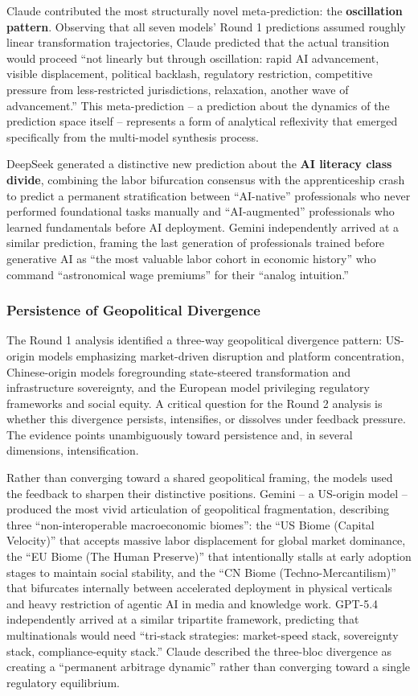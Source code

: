 \documentclass[preprint,review,12pt]{elsarticle}
\begin{document}
Claude contributed the most structurally novel meta-prediction: the \textbf{oscillation pattern}. Observing that all seven models' Round 1 predictions assumed roughly linear transformation trajectories, Claude predicted that the actual transition would proceed ``not linearly but through oscillation: rapid AI advancement, visible displacement, political backlash, regulatory restriction, competitive pressure from less-restricted jurisdictions, relaxation, another wave of advancement.'' This meta-prediction -- a prediction about the dynamics of the prediction space itself -- represents a form of analytical reflexivity that emerged specifically from the multi-model synthesis process.

DeepSeek generated a distinctive new prediction about the \textbf{AI literacy class divide}, combining the labor bifurcation consensus with the apprenticeship crash to predict a permanent stratification between ``AI-native'' professionals who never performed foundational tasks manually and ``AI-augmented'' professionals who learned fundamentals before AI deployment. Gemini independently arrived at a similar prediction, framing the last generation of professionals trained before generative AI as ``the most valuable labor cohort in economic history'' who command ``astronomical wage premiums'' for their ``analog intuition.''


\subsubsection{Persistence of Geopolitical Divergence}
\label{sec:geopolitical_persistence}

The Round 1 analysis identified a three-way geopolitical divergence pattern: US-origin models emphasizing market-driven disruption and platform concentration, Chinese-origin models foregrounding state-steered transformation and infrastructure sovereignty, and the European model privileging regulatory frameworks and social equity. A critical question for the Round 2 analysis is whether this divergence persists, intensifies, or dissolves under feedback pressure. The evidence points unambiguously toward persistence and, in several dimensions, intensification.

Rather than converging toward a shared geopolitical framing, the models used the feedback to sharpen their distinctive positions. Gemini -- a US-origin model -- produced the most vivid articulation of geopolitical fragmentation, describing three ``non-interoperable macroeconomic biomes'': the ``US Biome (Capital Velocity)'' that accepts massive labor displacement for global market dominance, the ``EU Biome (The Human Preserve)'' that intentionally stalls at early adoption stages to maintain social stability, and the ``CN Biome (Techno-Mercantilism)'' that bifurcates internally between accelerated deployment in physical verticals and heavy restriction of agentic AI in media and knowledge work. GPT-5.4 independently arrived at a similar tripartite framework, predicting that multinationals would need ``tri-stack strategies: market-speed stack, sovereignty stack, compliance-equity stack.'' Claude described the three-bloc divergence as creating a ``permanent arbitrage dynamic'' rather than converging toward a single regulatory equilibrium.
\end{document}
